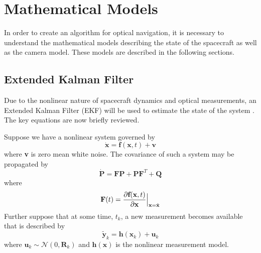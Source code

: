 \documentclass[]{aiaa-tc}%
\begin{document}

\section{Mathematical Models}
In order to create an algorithm for optical navigation, it is necessary to understand the mathematical models describing the state of the spacecraft as well as the camera model.  These models are described in the following sections.


\subsection{Extended Kalman Filter}
Due to the nonlinear nature of spacecraft dynamics and optical measurements, an Extended Kalman Filter (EKF) will be used to estimate the state of the system \cite{Gelb,KalmanFiltering}.  The key equations are now briefly reviewed.

Suppose we have a nonlinear system governed by 
%
\begin{equation}
\label{eq:F}
\dot{\textbf{x}}=\textbf{f}(\textbf{x},t)+\textbf{v}
\end{equation}
%
where \textbf{v} is zero mean white noise.  The covariance of such a system may be propagated by 
%
\begin{equation}
\label{eq:Pdot}
\dot{\textbf{P}}=\textbf{F}\textbf{P}+\textbf{P}\textbf{F}^T+\textbf{Q}
\end{equation}
%
where 
%
\begin{equation}
\label{eq:F}
\textbf{F}(t)=\frac{\partial{\textbf{f}(\textbf{x},t)}}{\partial{\textbf{x}}}\Big{|}_{\textbf{x}=\hat{\textbf{x}}}
\end{equation}
%
Further suppose that at some time, $t_{k}$, a new measurement becomes available that is described by 
%
\begin{equation}
\label{eq:ymeas}
\tilde{\textbf{y}}_k=\textbf{h}(\textbf{x}_k)+\textbf{u}_k
\end{equation}
%
where $\textbf{u}_k \sim \mathcal{N}(0,\textbf{R}_k)$ and $\textbf{h}(\textbf{x})$ is the nonlinear measurement model. 
%
%
\end{document}

